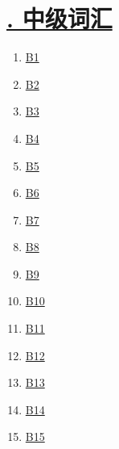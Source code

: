 \documentclass[11pt]{article}
\begin{document}
\vspace{-0.5cm}

\section*{\normalfont \large \href{https://www.youtube.com/watch?v=BdnMkCb9nOM&list=PL7aIrlqqP5K8_BmGCk4IFKeKP4ORS28a8}{. 中级词汇} }

\vspace{-0.5cm}

\begin{multicols}{5}
	\begin{enumerate}
		\item \href{https://mp.weixin.qq.com/s/W4k0zFiy96QevrpepntSdA}{B1}	%
		\item \href{https://mp.weixin.qq.com/s/ZQD2C48hWjmlON61IBxasg}{B2}	%
		\item \href{https://mp.weixin.qq.com/s/Wj62Z_jOt7MS0NFNWg9oPQ}{B3}	%
		\item \href{https://mp.weixin.qq.com/s/lR_X4mRjBctAkMq-EMsYug}{B4}	%
		\item \href{https://mp.weixin.qq.com/s/lMj3GuEJvzNnQL-p_eUzqQ}{B5}	%
		\item \href{https://mp.weixin.qq.com/s/8n8glcJgbNzMw57Y-Ajt7Q}{B6}	%
		\item \href{https://mp.weixin.qq.com/s/vnbgL7-CH6by9wIUO0Fffw}{B7}	%
		\item \href{https://mp.weixin.qq.com/s/PGmWUqtg-GRWRDiyb1P0-g}{B8}	%
		\item \href{https://mp.weixin.qq.com/s/eUmYfh0NqUHHS4hbW5-UUA}{B9}	%
		\item \href{https://mp.weixin.qq.com/s/u0lK7-EGM1FeDyrOAtuCWw}{B10}	%
		\item \href{https://mp.weixin.qq.com/s/0HylKPoWVNfUb6BZOj1Mvw}{B11}	%
		\item \href{https://mp.weixin.qq.com/s/chuUIqH0dWJo51x_ypSYqg}{B12}	%
		\item \href{https://mp.weixin.qq.com/s/Xy0Lyfkz8DVE0GUOjEx1Xw}{B13}	%
		\item \href{https://mp.weixin.qq.com/s/yrufPG8ojW3Prmc_GpO-1A}{B14}	%
		\item \href{https://mp.weixin.qq.com/s/HPb3-4ljuXKyVS9P3F72cw}{B15}	%
	\end{enumerate}
	
\end{multicols}


\vspace{-0.5cm}
\end{document}
